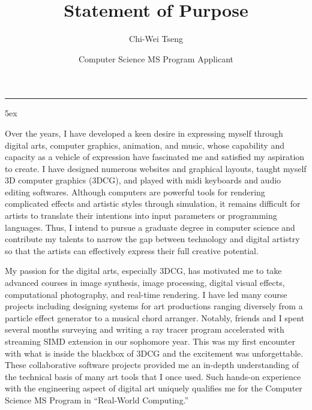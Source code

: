 \documentclass[a4paper, 11pt]{article}
\title{Statement of Purpose}
\author{Chi-Wei Tseng}
\date{Computer Science MS Program Applicant}
\makeatletter
\newcommand{\HRule}{\rule{\linewidth}{0.2mm}}
\renewcommand{\maketitle}{
  \parindent=0pt%
  \begin{flushleft}
  \bf \large{\@author} \hfill {\small \@date}
  \HRule
  \end{flushleft}
  \begin{center}
    \MakeUppercase{\bf \@title}
  \end{center}%
    \par
}
\makeatother
\begin{document}
{\large
{\linespread{0.8} \maketitle}
\parindent 5ex
}

Over the years, I have developed a keen desire in expressing myself through digital arts, computer graphics, animation, and music, whose capability and capacity as a vehicle of expression have fascinated me and satisfied my aspiration to create. I have designed numerous websites and graphical layouts, taught myself 3D computer graphics (3DCG), and played with midi keyboards and audio editing softwares. Although computers are powerful tools for rendering complicated effects and artistic styles through simulation, it remains difficult for artists to translate their intentions into input parameters or programming languages. Thus, I intend to pursue a graduate degree in computer science and contribute my talents to narrow the gap between technology and digital artistry so that the artists can effectively express their full creative potential.


My passion for the digital arts, especially 3DCG, has motivated me to take advanced courses in image synthesis, image processing, digital visual effects, computational photography, and real-time rendering. I have led many course projects including designing systems for art productions ranging diversely from a particle effect generator to a musical chord arranger. Notably, friends and I spent several months surveying and writing a ray tracer program accelerated with streaming SIMD extension in our sophomore year. This was my first encounter with what is inside the blackbox of 3DCG and the excitement was unforgettable. These collaborative software projects provided me an in-depth understanding of the technical basis of many art tools that I once used. Such hands-on experience with the engineering aspect of digital art uniquely qualifies me for the Computer Science MS Program in ``Real-World Computing.''
\end{document}
